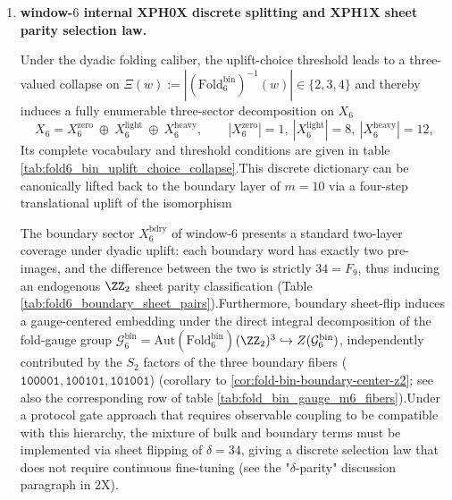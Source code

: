 \begin{enumerate}
\item \textbf{window-\(6\) internal \texorpdfstring{XPH0X}{1+8+12} discrete splitting and \texorpdfstring{XPH1X}{δ=34} sheet parity selection law. }
\begin{proposition}  \label{prop:terminal-window6-1-8-12-split}
Under the dyadic folding caliber, the uplift-choice threshold leads to a three-valued collapse on \(\Xi(w):=|(\mathrm{Fold}^{\mathrm{bin}}_6)^{-1}(w)|\in\{2,3,4\}\) and thereby induces a fully enumerable three-sector decomposition on \(X_6\)  \[
  X_6=X_6^{\mathrm{zero}}\ \oplus\ X_6^{\mathrm{light}}\ \oplus\ X_6^{\mathrm{heavy}},
  \qquad
  |X_6^{\mathrm{zero}}|=1,\ |X_6^{\mathrm{light}}|=8,\ |X_6^{\mathrm{heavy}}|=12,
  \]
Its complete vocabulary and threshold conditions are given in table \ref{tab:fold6_bin_uplift_choice_collapse}.This discrete dictionary can be canonically lifted back to the boundary layer of \(m=10\) via a four-step translational uplift of the isomorphism  \end{proposition}

\begin{corollary}[\texorpdfstring{XPH0X}{δ=34}'s two-layer coverage and discrete parity selection rules]  \label{cor:terminal-delta-parity-rule}
The boundary sector \(X_6^{\mathrm{bdry}}\) of window-\(6\) presents a standard two-layer coverage under dyadic uplift: each boundary word has exactly two pre-images, and the difference between the two is strictly \(34=F_9\), thus inducing an endogenous \(\ZZ_2\) sheet parity classification (Table \ref{tab:fold6_boundary_sheet_pairs}).Furthermore, boundary sheet-flip induces a gauge-centered embedding under the direct integral decomposition of the fold-gauge group \(\mathcal{G}^{\mathrm{bin}}_6=\mathrm{Aut}(\mathrm{Fold}^{\mathrm{bin}}_6)\)\((\ZZ_2)^3\hookrightarrow Z(\mathcal{G}^{\mathrm{bin}}_6)\), independently contributed by the \(S_2\) factors of the three boundary fibers (\(\texttt{100001},\texttt{100101},\texttt{101001}\)) (corollary to \ref{cor:fold-bin-boundary-center-z2}; see also the corresponding row of table \ref{tab:fold_bin_gauge_m6_fibers}).Under a protocol gate approach that requires observable coupling to be compatible with this hierarchy, the mixture of bulk and boundary terms must be implemented via sheet flipping of \(\delta=34\), giving a discrete selection law that does not require continuous fine-tuning (see the "\(\delta\)-parity" discussion paragraph in \SXPH2X).  \end{corollary}


\end{enumerate}
